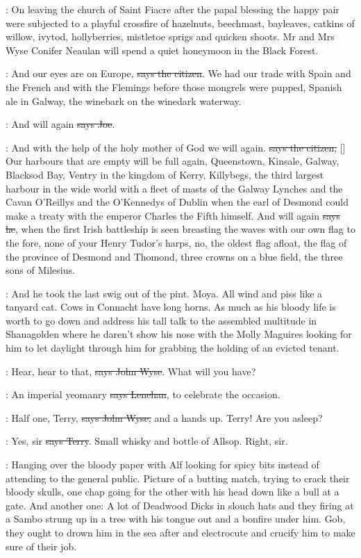 :
On leaving the church of Saint Fiacre  after the papal
blessing the happy pair were subjected to a playful crossfire
of hazelnuts, beechmast, bayleaves, catkins of willow, ivytod,
hollyberries, mistletoe sprigs and quicken shoots. Mr and Mrs Wyse
Conifer Neaulan will spend a quiet honeymoon in the Black Forest.

\citizen:
And our eyes are on Europe, \sout{says the citizen}.
We had our trade with
Spain and the French and with the Flemings before those mongrels were
pupped, Spanish ale in Galway, the winebark on the winedark waterway.

\joe:
And will again \sout{says Joe}.

\citizen:
And with the help of the holy mother of God
we will again.
\sout{says the
citizen,} []
Our harbours that are empty will be full
again, Queenstown, Kinsale, Galway, Blacksod Bay, Ventry in the kingdom of
Kerry, Killybegs, the third largest harbour in the wide world with a fleet
of masts of the Galway Lynches and the Cavan O'Reillys and the
O'Kennedys of Dublin when the earl of Desmond could make a treaty with
the emperor Charles the Fifth himself. And will again \sout{says he}, when the
first Irish battleship is seen breasting the waves with our own flag to
the fore, none of your Henry Tudor's harps, no, the oldest flag afloat,
the flag of the province of Desmond and Thomond, three crowns on a blue
field, the three sons of Milesius.%

\Nq:
And he took the last swig out of the pint. Moya. All wind and piss like
a tanyard cat. Cows in Connacht have long horns. As much as his bloody
life is worth to go down and address his tall talk to the assembled
multitude in Shanagolden where he daren't show his nose with the Molly
Maguires looking for him to let daylight through him for grabbing the
holding of an evicted tenant.

\johnwyse:
Hear, hear to that, \sout{says John Wyse}.
What will you have?

\lenehan:
An imperial yeomanry \sout{says Lenehan},
to celebrate the occasion.

\johnwyse:
Half one, Terry, \sout{says John Wyse,}
and a hands up. Terry! Are you asleep?

\terry:
Yes, sir \sout{says Terry}.
Small whisky and bottle of Allsop.
Right, sir.

\Nq:
Hanging over the bloody paper with Alf looking for spicy bits instead
of attending to the general public. Picture of a butting match, trying to
crack their bloody skulls, one chap going for the other with his head down
like a bull at a gate. And another one:
A lot of Deadwood Dicks in slouch hats and they firing at a Sambo strung
up in a tree with his tongue out and a bonfire under him. Gob, they ought
to drown him in the sea after and electrocute and crucify him to make sure
of their job.

